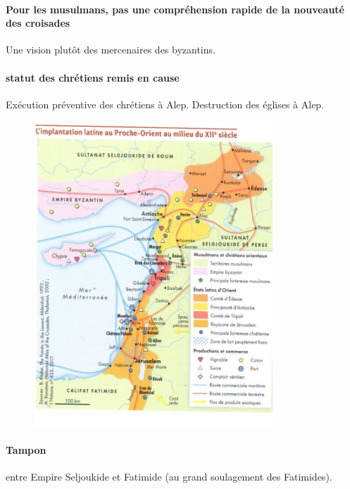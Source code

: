 \paragraph{Pour les musulmans, pas une compréhension rapide de la nouveauté des croisades} Une vision plutôt des mercenaires des byzantins.

\paragraph{statut des chrétiens remis en cause} Exécution préventive des chrétiens à Alep. Destruction des églises à Alep.


  \begin{figure}[h!]
\centering
{}
\includegraphics[width=0.8\textwidth]{HistoireIslamMediterranee/Images/Latin.jpg}
     
     \label{fig:Latin}
 \end{figure}


\paragraph{Tampon} entre Empire Seljoukide et Fatimide (au grand soulagement des Fatimides). 

